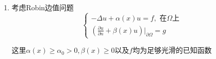 \documentclass[12pt,a4paper]{article}
\begin{document}
\begin{enumerate}
		\begin{proof}
			利用反证法. 假设\eqref{poincare}不成立. 对每个正整数$k$, 存在$v_k\in H^m(\Omega)$使
			
			$$
			\|v_k\|^2_{m,\Omega}>k\Big(|v_k|_{m,\Omega}^2+\sum_{|\alpha|<m}\Big(\int_\Omega\partial^\alpha v_k\mathrm{dx}\Big)^2\Big).
			$$
			
			不失一般性，设$v_k$满足
			
			$$
			\left\|v_k\right\|_{m,\Omega}=1,\:k=1,2,\cdots,
			$$
			
			这样有
			
			$$
			\lim_{k\to\infty}|v_k|_{m,\Omega}=0.
			$$
			$$
			\lim_{k\to\infty}\int_\Omega\partial^\alpha v_k\mathrm{dx} = 0, \quad \forall \alpha \quad s.t. |\alpha|<m
			$$
			
			因为$\{v_k\}$是$H^m(\Omega)$的有界序列，所以存在$v_\infty\in H^m(\Omega)$和一个子列(仍记为$\{v_k\})$满足：$\{v_k\}$弱收敛于$v_\infty$. 利用嵌入定理$H^m(\Omega)\overset{c}{\operatorname*{\hookrightarrow}}H^{m-1}(\Omega)$,
			在$H^{m-1}(\Omega)$中$\{v_k\}$强收敛于$v_{\infty}.$
			
			于是
			
			$$
			\lim_{k,\ell\to\infty}\|v_k-v_\ell\|_{m,\Omega}\leq\lim_{k,\ell\to\infty}\left(\|v_k-v_\ell\|_{m-1,\Omega}+|v_k-v_\ell|_{m,\Omega}\right)=0.
			$$
			因此$\{v_k\}$是$H^m(\Omega)$中的Cauchy序列，进而$\{v_k\}$在$H^m(\Omega)$中强收敛于$v_\infty.$ 由极限得到$\|v_\infty\|_{m,\Omega}=1$和$|v_\infty|_{m,\Omega}=0$, 即$v_{\infty}$是一个$m-1$次多项式. 
			
			注意到
			$$
			\int_\Omega\partial^\alpha v_\infty \mathrm{dx} = 0, \quad \forall \alpha \quad s.t. \ |\alpha|<m
			$$,
			
			可得$v_\infty\equiv0$.与$v_\infty\neq0$矛盾.上面讨论可推出Poincaré不等式成立.
			
			
		\end{proof}
		
		\item 考虑Robin边值问题
		\begin{equation}
			\begin{cases}-\Delta u+\alpha(x)u=f,\text{ 在}\Omega \text{上}\\(\frac{\partial u}{\partial n}+\beta(x)u)\left.\right|_{\partial\Omega}=g&\end{cases}
			\label{robin}
		\end{equation}
		
		
		这里$\alpha(x)\geq\alpha_0>0,\beta(x)\geq0$以及$f$均为足够光滑的已知函数
		

\end{enumerate}
\end{document}
